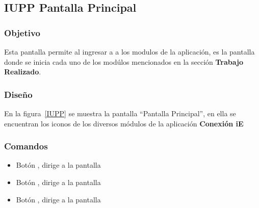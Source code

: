\subsection{IUPP  Pantalla Principal}

\subsubsection{Objetivo}

	
    Esta pantalla permite al  ingresar a a los modulos de la aplicación, es la pantalla donde se inicia cada uno de los modúlos mencionados en la sección \textbf{Trabajo Realizado}.
\subsubsection{Diseño}


    En la figura~\ref{IUPP} se muestra la pantalla ``Pantalla Principal'', en ella se encuentran los iconos de los diversos módulos de la aplicación \textbf{Conexión iE}



\subsubsection{Comandos}
    \begin{itemize}

	\item Botón \botSalones, dirige a la pantalla 
	\item Botón \botProfesores, dirige a la pantalla 
	\item Botón \botUnidades, dirige a la pantalla 
    \end{itemize}
